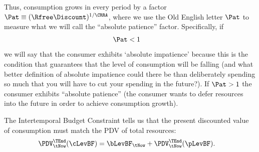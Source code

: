 Thus, consumption grows in every period by a factor $\Pat \equiv (\Rfree\Discount)^{1/\CRRA}$, where we use the Old English letter $\Pat$ to measure what we will call the ``absolute patience'' factor.  Specifically, if
\begin{equation}\begin{gathered}\begin{aligned}
     \Pat & <  1 \label{eq:AIC}
\end{aligned}\end{gathered}\end{equation}
we will say that the consumer exhibits `absolute impatience' because this is the condition that guarantees that the level of consumption will be falling (and what better definition of absolute impatience could there be than deliberately spending so much that you will have to cut your spending in the future?).  If $\Pat > 1$ the consumer exhibits ``absolute patience'' (the consumer wants to defer resources into the future in order to achieve consumption growth).


The Intertemporal Budget Constraint tells us that the present discounted
value of consumption must match the PDV of total resources:
\begin{equation}\begin{gathered}\begin{aligned}
        \PDV_{\tNow}^{\TEnd}(\cLevBF) & =  \bLevBF_{\tNow}+\PDV_{\tNow}^{\TEnd}(\pLevBF).
        \label{eq:ibc}
\end{aligned}\end{gathered}\end{equation}

